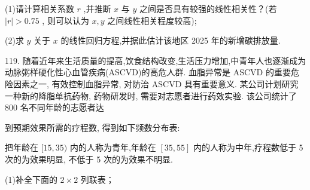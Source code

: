 \begin{center}
\end{center}

(1)请计算相关系数 $r$ ,并推断 $x$ 与 $y$ 之间是否具有较强的线性相关性？(若 $\left| r\right|  > {0.75}$ , 则可以认为 $x,y$ 之间线性相关程度较高);

(2)求 $y$ 关于 $x$ 的线性回归方程,并据此估计该地区 2025 年的新增碳排放量.

119. 随着近年来生活质量的提高,饮食结构改变,生活压力增加,中青年人也逐渐成为动脉粥样硬化性心血管疾病(ASCVD)的高危人群. 血脂异常是 ASCVD 的重要危险因素之一, 有效控制血脂异常, 对防治 ASCVD 具有重要意义. 某公司计划研究一种新的降脂单抗药物, 药物研发时, 需要对志愿者进行药效实验. 该公司统计了 800 名不同年龄的志愿者达

到预期效果所需的疗程数, 得到如下频数分布表:

\begin{center}
\end{center}

把年龄在 $\lbrack {15},{35})$ 内的人称为青年,年龄在 $\left\lbrack  {{35},{55}}\right\rbrack$ 内的人称为中年,疗程数低于 5 次的为效果明显, 不低于 5 次的为效果不明显.

(1)补全下面的 $2 \times  2$ 列联表；

\begin{center}
\end{center}

